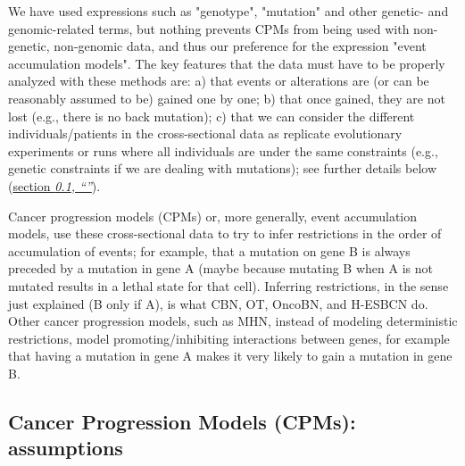 \documentclass[a4paper,11pt]{article}
\newcommand*{\qrefS}[1]{\hyperref[{#1}]{section \textit{\ref*{#1},
      ``\nameref*{#1}''}}}
\begin{document}
We have used expressions such as "genotype", "mutation" and other genetic- and genomic-related terms, but nothing prevents CPMs from being used with non-genetic, non-genomic data, and thus our preference for the expression "event accumulation models". The key features that the data must have to be properly analyzed with these methods are: a) that events or alterations are (or can be reasonably assumed to be) gained one by one; b) that once gained, they are not lost (e.g., there is no back mutation); c) that we can consider the different individuals/patients in the cross-sectional data as replicate evolutionary experiments or runs where all individuals are under the same constraints (e.g., genetic constraints if we are dealing with mutations); see further details below (\qrefS{assumpt}).


Cancer progression models (CPMs) or, more generally, event accumulation models, use these cross-sectional data to try to infer restrictions in the order of accumulation of events; for example, that a mutation on gene B is always preceded by a mutation in gene A (maybe because mutating B when A is not mutated results in a lethal state for that cell). Inferring restrictions, in the sense just explained (B only if A), is what CBN, OT, OncoBN, and H-ESBCN do. Other cancer progression models, such as MHN, instead of modeling deterministic restrictions, model promoting/inhibiting interactions between genes, for example that having a mutation in gene A makes it very likely to gain a mutation in gene B. 



\subsection{Cancer Progression Models (CPMs): assumptions}\label{assumpt}
\end{document}
